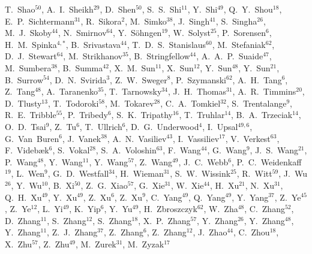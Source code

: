 {T.~Shao$^{50}$,
A.~I.~Sheikh$^{29}$,
D.~Shen$^{50}$,
S.~S.~Shi$^{11}$,
Y.~Shi$^{49}$,
Q.~Y.~Shou$^{18}$,
E.~P.~Sichtermann$^{31}$,
R.~Sikora$^{2}$,
M.~Simko$^{38}$,
J.~Singh$^{41}$,
S.~Singha$^{26}$,
M.~J.~Skoby$^{44}$,
N.~Smirnov$^{64}$,
Y.~S\"{o}hngen$^{19}$,
W.~Solyst$^{25}$,
P.~Sorensen$^{6}$,
H.~M.~Spinka$^{4,*}$,
B.~Srivastava$^{44}$,
T.~D.~S.~Stanislaus$^{60}$,
M.~Stefaniak$^{62}$,
D.~J.~Stewart$^{64}$,
M.~Strikhanov$^{35}$,
B.~Stringfellow$^{44}$,
A.~A.~P.~Suaide$^{47}$,
M.~Sumbera$^{38}$,
B.~Summa$^{42}$,
X.~M.~Sun$^{11}$,
X.~Sun$^{12}$,
Y.~Sun$^{48}$,
Y.~Sun$^{21}$,
B.~Surrow$^{54}$,
D.~N.~Svirida$^{3}$,
Z.~W.~Sweger$^{8}$,
P.~Szymanski$^{62}$,
A.~H.~Tang$^{6}$,
Z.~Tang$^{48}$,
A.~Taranenko$^{35}$,
T.~Tarnowsky$^{34}$,
J.~H.~Thomas$^{31}$,
A.~R.~Timmins$^{20}$,
D.~Tlusty$^{13}$,
T.~Todoroki$^{58}$,
M.~Tokarev$^{28}$,
C.~A.~Tomkiel$^{32}$,
S.~Trentalange$^{9}$,
R.~E.~Tribble$^{55}$,
P.~Tribedy$^{6}$,
S.~K.~Tripathy$^{16}$,
T.~Truhlar$^{14}$,
B.~A.~Trzeciak$^{14}$,
O.~D.~Tsai$^{9}$,
Z.~Tu$^{6}$,
T.~Ullrich$^{6}$,
D.~G.~Underwood$^{4}$,
I.~Upsal$^{49,6}$,
G.~Van~Buren$^{6}$,
J.~Vanek$^{38}$,
A.~N.~Vasiliev$^{43}$,
I.~Vassiliev$^{17}$,
V.~Verkest$^{63}$,
F.~Videb{\ae}k$^{6}$,
S.~Vokal$^{28}$,
S.~A.~Voloshin$^{63}$,
F.~Wang$^{44}$,
G.~Wang$^{9}$,
J.~S.~Wang$^{21}$,
P.~Wang$^{48}$,
Y.~Wang$^{11}$,
Y.~Wang$^{57}$,
Z.~Wang$^{49}$,
J.~C.~Webb$^{6}$,
P.~C.~Weidenkaff$^{19}$,
L.~Wen$^{9}$,
G.~D.~Westfall$^{34}$,
H.~Wieman$^{31}$,
S.~W.~Wissink$^{25}$,
R.~Witt$^{59}$,
J.~Wu$^{26}$,
Y.~Wu$^{10}$,
B.~Xi$^{50}$,
Z.~G.~Xiao$^{57}$,
G.~Xie$^{31}$,
W.~Xie$^{44}$,
H.~Xu$^{21}$,
N.~Xu$^{31}$,
Q.~H.~Xu$^{49}$,
Y.~Xu$^{49}$,
Z.~Xu$^{6}$,
Z.~Xu$^{9}$,
C.~Yang$^{49}$,
Q.~Yang$^{49}$,
Y.~Yang$^{37}$,
Z.~Ye$^{45}$,
Z.~Ye$^{12}$,
L.~Yi$^{49}$,
K.~Yip$^{6}$,
Y.~Yu$^{49}$,
H.~Zbroszczyk$^{62}$,
W.~Zha$^{48}$,
C.~Zhang$^{52}$,
D.~Zhang$^{11}$,
S.~Zhang$^{12}$,
S.~Zhang$^{18}$,
X.~P.~Zhang$^{57}$,
Y.~Zhang$^{26}$,
Y.~Zhang$^{48}$,
Y.~Zhang$^{11}$,
Z.~J.~Zhang$^{37}$,
Z.~Zhang$^{6}$,
Z.~Zhang$^{12}$,
J.~Zhao$^{44}$,
C.~Zhou$^{18}$,
X.~Zhu$^{57}$,
Z.~Zhu$^{49}$,
M.~Zurek$^{31}$,
M.~Zyzak$^{17}$
}

